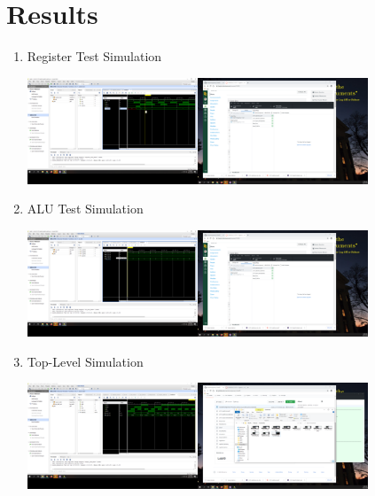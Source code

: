 \documentclass[11pt]{article}
\begin{document}
\section*{Results}
\begin{enumerate}
	
\item Register Test Simulation

\includegraphics[width=0.8\textwidth, trim= 28.5cm 16cm 68cm 5.5cm, clip]{register_test.PNG}
\label{fig:Register Test Simulation}

\item ALU Test Simulation 

\includegraphics[width=0.8\textwidth, trim= 28.5cm 16cm 68cm 5.5cm, clip]{alu_test.PNG}
\label{fig:ALU Test Simulation}

\pagebreak

\item Top-Level Simulation 

\includegraphics[width=0.8\textwidth, trim= 28.5cm 16cm 68cm 5.5cm, clip]{top_level_test.PNG}
\label{fig:Top-Level Simulation }


\end{enumerate}
\end{document}
